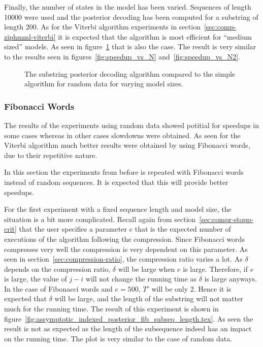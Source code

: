 Finally, the number of states in the model has been varied. Sequences of length
10000 were used and the posterior decoding has been computed for a substring of
length 200. As for the Viterbi algorithm experiments in
section~\ref{sec:comp-ziphmml-viterbi} it is expected that the algorithm is
most efficient for ``medium sized'' models. As seen in
figure~\ref{fig:indexed_posterior_speedup_vs_N} that is also the case. The
result is very similar to the results seen in figures~\ref{fig:speedup_vs_N}
and~\ref{fig:speedup_vs_N2}.

\begin{figure}
  \centering
  
  \caption{The substring posterior decoding algorithm compared to the simple
    algorithm for random data for varying model sizes.}
  \label{fig:indexed_posterior_speedup_vs_N}
\end{figure}

\subsubsection{Fibonacci Words}

The results of the experiments using random data showed potitial for speedups
in some cases whereas in other cases slowdowns were obtained. As seen for the
Viterbi algorithm much better results were obtained by using Fibonacci words,
due to their repetitive nature.

In this section the experiments from before is repeated with Fibonacci words
instead of random sequences. It is expected that this will provide better
speedups.

For the first experiment with a fixed sequence length and model size, the
situation is a bit more complicated. Recall again from
section~\ref{sec:compr-stopp-crit} that the user specifies a parameter $e$ that
is the expected number of executions of the algorithm following the
compression. Since Fibonacci words compresses very well the compression is very
dependent on this parameter. As seen in section~\ref{sec:compression-ratio},
the compression ratio varies a lot.  As $\delta$
depends on the compression ratio, $\delta$ will be large when $e$ is
large. Therefore, if $e$ is large, the value of $j - i$ will not change the
running time as $\delta$ is large anyways. In the case of Fibonacci words and
$e = 500$, $T'$ will be only 2. Hence it is expected that $\delta$ will be
large, and the length of the substring will not matter much for the running
time. The result of this experiment is shown in
figure~\ref{fig:assymptotic_indexed_posterior_fib_subseq_length.tex}. As seen
the result is not as expected as the length of the subsequence indeed has an
impact on the running time. The plot is very similar to the case of random
data. 

